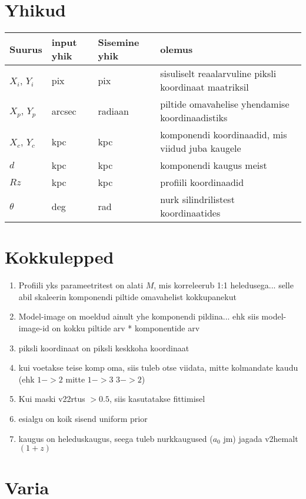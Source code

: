 \documentclass{article}
\begin{document}
	\section{Yhikud} %
	\label{sec:yhikud}
	\begin{tabular}{llll}
		Suurus & input yhik & Sisemine yhik & olemus\\
		\hline
		$X_i$, $Y_i$ & pix & pix & sisuliselt reaalarvuline piksli koordinaat maatriksil\\
		$X_p$, $Y_p$ & arcsec & radiaan & piltide omavahelise yhendamise koordinaadistiks\\
		$X_c$, $Y_c$ & kpc & kpc & komponendi koordinaadid, mis viidud juba kaugele\\
		$d$ & kpc & kpc & komponendi kaugus meist\\
		$Rz$ & kpc & kpc & profiili koordinaadid \\
		$\theta$ & deg & rad & nurk silindrilistest koordinaatides\\
	\end{tabular}
	
	
	
	
	\section{Kokkulepped} %
	\label{sec:kokkulepped}
	\begin{enumerate}
		\item Profiili yks parameetritest on alati $M$, mis korreleerub 1:1 heledusega... selle abil skaleerin komponendi piltide omavahelist kokkupanekut
		\item Model-image on moeldud ainult yhe komponendi pildina... ehk siis model-image-id on kokku piltide arv * komponentide arv
		\item piksli koordinaat on piksli keskkoha koordinaat
		\item kui voetakse teise komp oma, siis tuleb otse viidata, mitte kolmandate kaudu (ehk $1->2$ mitte $1->3$ $3->2$)
		\item Kui maski v22rtus $>0.5$, siis kasutatakse fittimisel
		\item esialgu on koik sisend uniform prior
		\item kaugus on heleduskaugus, seega tuleb nurkkaugused ($a_0$ jm) jagada v2hemalt $(1+z)$
	\end{enumerate}

	
	
	\section{Varia} %
	\label{sec:varia}
	
\end{document}
